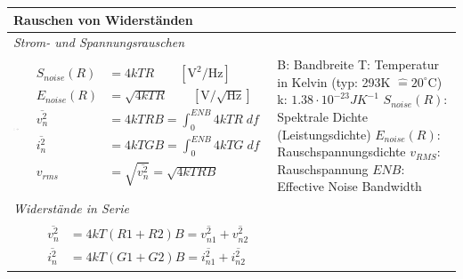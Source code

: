 \vspace{-2.5\topsep}
\begin{longtable}[t]{|p{4cm}|p{6.5cm}|p{7cm}|}
    \hline
    \multicolumn{3}{|l|}{\bf Rauschen von Widerständen}
    \\ \hline
    \multicolumn{3}{|l|}{\textit{Strom- und Spannungsrauschen}}
    \\ \hdashline
    \includegraphics[width=4cm, valign=t]{pictures/widerstandrauschen.png}
    & {	\vspace{-1.8\topsep}
        \begin{align*}
            S_{noise}(R) &=4kTR \qquad [\mathrm{V^2/Hz}]\\
            E_{noise}(R) &=\sqrt{4kTR} \qquad [\mathrm{V/\sqrt{Hz}}]\\
            \overline{v^2_{n}} &=4kTRB = \int_0^{ENB} 4kTR \; df\\
            \overline{i^2_{n}} &=4kTGB = \int_0^{ENB} 4kTG \; df\\
            v_{rms} &= \sqrt{\overline{v^2_{n}}} = \sqrt{4kTRB}
        \end{align*}
      }
    & {B: Bandbreite\newline
       T:  Temperatur in Kelvin (typ: 293K $\hat{=}20^{\circ}$C)\newline
       k:  $1.38 \cdot 10^{-23}JK^{-1}$\newline
       $S_{noise}(R)$:  Spektrale Dichte (Leistungsdichte)\newline
       $E_{noise}(R)$: Rauschspannungsdichte\newline
       $v_{RMS}$:  Rauschspannung\newline
       $ENB$: Effective Noise Bandwidth
      }
    \\ \hline
    \multicolumn{3}{|l|}{\textit{Widerstände in Serie}}
    \\ \hdashline
    
    & {	\vspace{-1.6\topsep}
        \begin{align*}
            \overline{v^2_{n}}&=4kT(R1+R2)B=\overline{v^2_{n1}}+\overline{v^2_{n2}}\\
            \overline{i^2_{n}}&=4kT(G1+G2)B=\overline{i^2_{n1}}+\overline{i^2_{n2}}
        \end{align*}
    }
    & 
    \\ \hline
\end{longtable}
